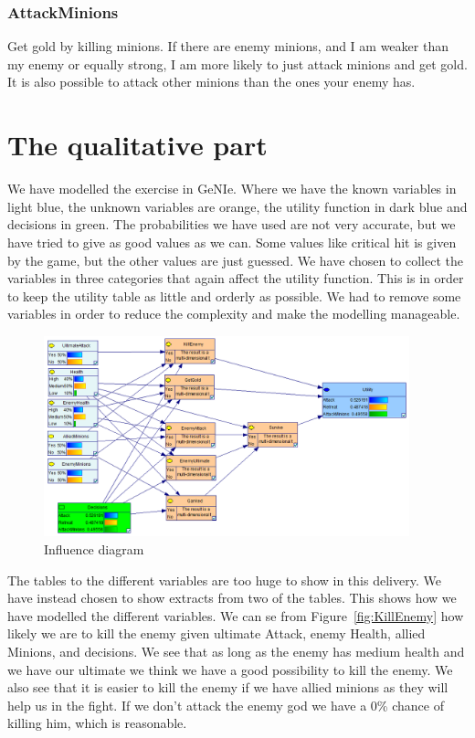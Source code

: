 \documentclass[titlepage]{article}
\begin{document}
\subsubsection*{AttackMinions}
Get gold by killing minions. If there are enemy minions, and I am weaker than my enemy or equally strong, I am more likely to just attack minions and get gold. It is also possible to attack other minions than the ones your enemy has. 

\newpage

\section{The qualitative part}
We have modelled the exercise in GeNIe. Where we have the known variables in light blue, the unknown variables are orange, the utility function in dark blue and decisions in green. The probabilities we have used are not very accurate, but we have tried to give as good values as we can. Some values like critical hit is given by the game, but the other values are just guessed. We have chosen to collect the variables in three categories that again affect the utility function. This is in order to keep the utility table as little and orderly as possible. We had to remove some variables in order to reduce the complexity and make the modelling manageable.

\begin{figure}[H]
\label{fig:Influencediagram}
\includegraphics[width=400px]{InfluenceDiagram.PNG}
\caption{Influence diagram}
\end{figure}

The tables to the different variables are too huge to show in this delivery. We have instead chosen to show extracts from two of the tables. This shows how we have modelled the different variables. We can se from Figure~\ref{fig:KillEnemy} how likely we are to kill the enemy given ultimate Attack, enemy Health, allied Minions, and decisions. We see that as long as the enemy has medium health and we have our ultimate we think we have a good possibility to kill the enemy. We also see that it is easier to kill the enemy if we have allied minions as they will help us in the fight. If we don't attack the enemy god we have a 0\% chance of killing him, which is reasonable.
\end{document}
